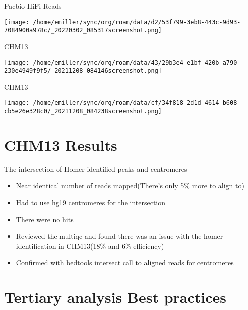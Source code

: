 \documentclass[bigger]{beamer}
\begin{document}
\begin{frame}[label={sec:org7b9e394}]{Pacbio HiFi Reads}
\begin{center}
\texttt{[image: /home/emiller/sync/org/roam/data/d2/53f799-3eb8-443c-9d93-7084900a978c/\_20220302\_085317screenshot.png]}
\end{center}
\end{frame}



\begin{frame}[label={sec:org6f60a80}]{CHM13}
\begin{center}
\texttt{[image: /home/emiller/sync/org/roam/data/43/29b3e4-e1bf-420b-a790-230e4949f9f5/\_20211208\_084146screenshot.png]}
\end{center}
\end{frame}

\begin{frame}[label={sec:orgf6262b9}]{CHM13}
\begin{center}
\texttt{[image: /home/emiller/sync/org/roam/data/cf/34f818-2d1d-4614-b608-cb5e26e328c0/\_20211208\_084238screenshot.png]}
\end{center}
\end{frame}


\section{CHM13 Results}
\label{sec:org0e7e850}

\begin{frame}[label={sec:org0cd352c}]{The intersection of Homer identified peaks and centromeres}
\begin{itemize}
\item Near identical number of reads mapped(There's only 5\% more to align to)
\item Had to use hg19 centromeres for the intersection
\item There were no hits
\item Reviewed the multiqc and found there was an issue with the homer
identification in CHM13(18\% and 6\% efficiency)
\item Confirmed with bedtools intersect call to aligned reads for centromeres
\end{itemize}
\end{frame}


\section{Tertiary analysis Best practices}
\label{sec:org93508dc}
\end{document}
